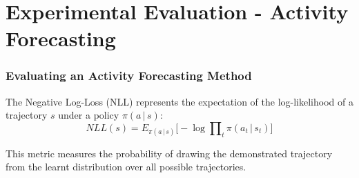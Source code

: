 \section{Experimental Evaluation - Activity Forecasting}

\begin{frame}
	\frametitle{Evaluating an Activity Forecasting Method}
	
	\Large
	
	\vspace{0.45cm}
	
	The Negative Log-Loss (NLL) represents the expectation of the log-likelihood of a trajectory $ s $
	under a policy $ \pi(a \, | \, s) $:
	\vspace{-0.1cm}
	\begin{equation*}
		NLL(s) = E_{\pi(a \, | \, s)} \Big [ -\log \prod\nolimits_t \pi(a_t \, | \, s_t)  \Big ]
	\end{equation*}
	
	\vspace{0.1cm}
	
	This metric measures the probability of drawing the demonstrated trajectory from the learnt
	distribution over all possible trajectories. \\
\end{frame}

